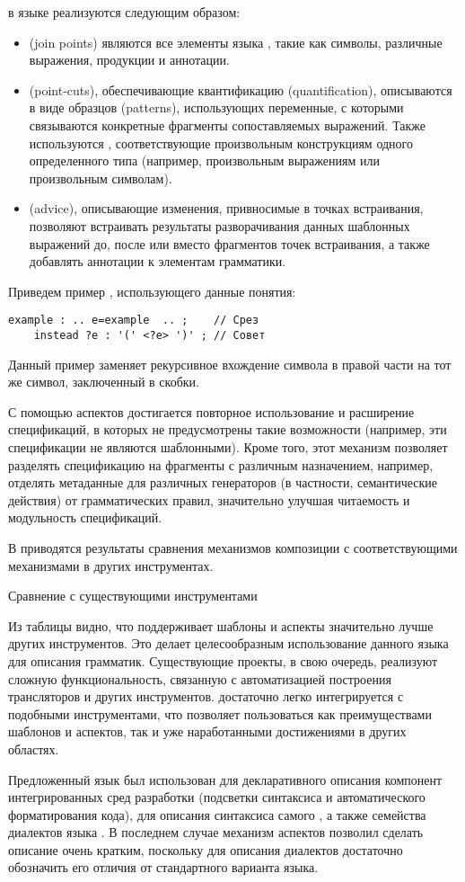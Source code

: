  в языке \GRM{} реализуются следующим образом:
\begin{itemize}
\item {} (join points) являются все элементы языка \GRM{}, такие как символы, различные выражения, продукции и аннотации.
\item {} (point-cuts), обеспечивающие квантификацию (quantification), описываются в виде образцов (patterns), использующих переменные, с которыми связываются конкретные фрагменты сопоставляемых выражений. Также используются , соответствующие произвольным конструкциям одного определенного типа (например, произвольным выражениям или произвольным символам).
\item {} (advice), описывающие изменения, привносимые в точках встраивания, позволяют встраивать результаты разворачивания данных шаблонных выражений до, после или вместо фрагментов точек встраивания, а также добавлять аннотации к элементам грамматики.
\end{itemize}
Приведем пример , использующего данные понятия:
\begin{lstlisting}
example : .. e=example  .. ;    // Срез
	instead ?e : '(' <?e> ')' ; // Совет
\end{lstlisting}
Данный пример заменяет рекурсивное вхождение символа  в правой части на тот же символ, заключенный в скобки.

С помощью аспектов достигается повторное использование  и расширение спецификаций, в которых не предусмотрены такие возможности (например, эти спецификации не являются шаблонными). Кроме того, этот механизм позволяет разделять спецификацию на фрагменты с различным назначением, например, отделять метаданные для различных генераторов (в частности, семантические действия) от грамматических правил, значительно улучшая читаемость и модульность спецификаций.

В  приводятся результаты сравнения механизмов композиции \GRM{} с соответствующими механизмами в других инструментах.
\begin{table}[htb]
	\centering
\newcommand{\dissonly}[1]{}

	\caption{Сравнение \GRM{} с существующими инструментами}\label{GrmTable}
\end{table}
Из таблицы видно, что \GRM{} поддерживает шаблоны и аспекты значительно лучше других инструментов. Это делает целесообразным использование данного языка для описания грамматик. Существующие проекты, в свою очередь, реализуют сложную функциональность, связанную с автоматизацией построения трансляторов и других инструментов. \GRM{} достаточно легко интегрируется с подобными инструментами, что позволяет пользоваться как преимуществами шаблонов и аспектов, так и уже наработанными достижениями в других областях. 

Предложенный язык был использован для декларативного описания компонент интегрированных сред разработки (подсветки синтаксиса и автоматического форматирования кода), для описания синтаксиса самого \GRM{}, а также семейства диалектов языка . В последнем случае механизм аспектов позволил сделать описание очень кратким, поскольку для описания диалектов достаточно обозначить его отличия от стандартного варианта языка.